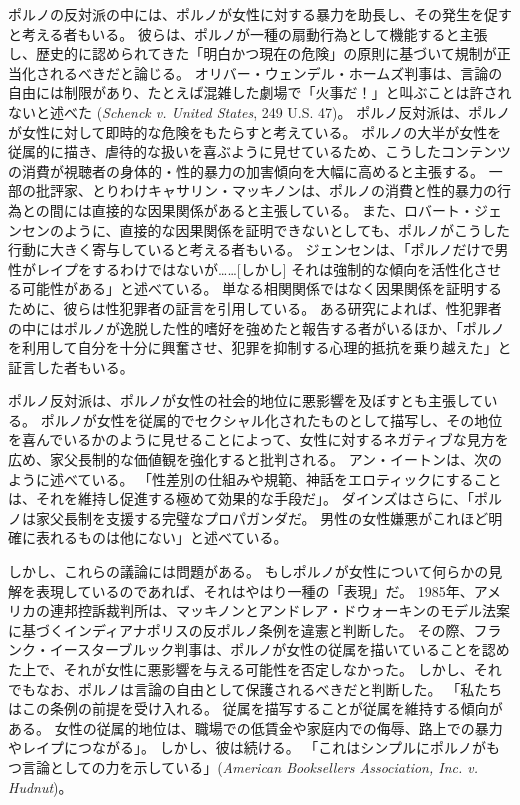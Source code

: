 \documentclass[paper=a4,book,openany]{jlreq} \usepackage{mystyle}
\begin{document}
ポルノの反対派の中には、ポルノが女性に対する暴力を助長し、その発生を促すと考える者もいる。
彼らは、ポルノが一種の扇動行為として機能すると主張し、歴史的に認められてきた「明白かつ現在の危険」の原則に基づいて規制が正当化されるべきだと論じる。
オリバー・ウェンデル・ホームズ判事は、言論の自由には制限があり、たとえば混雑した劇場で「火事だ！」と叫ぶことは許されないと述べた
(\emph{Schenck v. United States}, 249 U.S. 47)。
ポルノ反対派は、ポルノが女性に対して即時的な危険をもたらすと考えている。
ポルノの大半が女性を従属的に描き、虐待的な扱いを喜ぶように見せているため、こうしたコンテンツの消費が視聴者の身体的・性的暴力の加害傾向を大幅に高めると主張する。
一部の批評家、とりわけキャサリン・マッキノンは、ポルノの消費と性的暴力の行為との間には直接的な因果関係があると主張している\citep{mackinnon94:_pornog}。
また、ロバート・ジェンセンのように、直接的な因果関係を証明できないとしても、ポルノがこうした行動に大きく寄与していると考える者もいる。
ジェンセンは、「ポルノだけで男性がレイプをするわけではないが……[しかし] それは強制的な傾向を活性化させる可能性がある」と述べている\citep[p.103]{jensen07:gettingoff}。
単なる相関関係ではなく因果関係を証明するために、彼らは性犯罪者の証言を引用している。
ある研究によれば、性犯罪者の中にはポルノが逸脱した性的嗜好を強めたと報告する者がいるほか、「ポルノを利用して自分を十分に興奮させ、犯罪を抑制する心理的抵抗を乗り越えた」と証言した者もいる\citep[p.70]{marshall00:_revis_use_pornog_sexual_offen}。

ポルノ反対派は、ポルノが女性の社会的地位に悪影響を及ぼすとも主張している。
ポルノが女性を従属的でセクシャル化されたものとして描写し、その地位を喜んでいるかのように見せることによって、女性に対するネガティブな見方を広め、家父長制的な価値観を強化すると批判される\citep{hald13:_pornog_sexis_attit_among_heter}。
アン・イートンは、次のように述べている。
「性差別の仕組みや規範、神話をエロティックにすることは、それを維持し促進する極めて効果的な手段だ」\citep{eaton07:sensibleantiporn}。
ダインズはさらに、「ポルノは家父長制を支援する完璧なプロパガンダだ。
男性の女性嫌悪がこれほど明確に表れるものは他にない」と述べている\citep{bindel10:_truth_porn_indus}。

しかし、これらの議論には問題がある。
もしポルノが女性について何らかの見解を表現しているのであれば、それはやはり一種の「表現」だ。
1985年、アメリカの連邦控訴裁判所は、マッキノンとアンドレア・ドウォーキンのモデル法案に基づくインディアナポリスの反ポルノ条例を違憲と判断した。
その際、フランク・イースターブルック判事は、ポルノが女性の従属を描いていることを認めた上で、それが女性に悪影響を与える可能性を否定しなかった。
しかし、それでもなお、ポルノは言論の自由として保護されるべきだと判断した。
「私たちはこの条例の前提を受け入れる。
従属を描写することが従属を維持する傾向がある。
女性の従属的地位は、職場での低賃金や家庭内での侮辱、路上での暴力やレイプにつながる」。
しかし、彼は続ける。
「これはシンプルにポルノがもつ言論としての力を示している」(\emph{American Booksellers Association, Inc. v. Hudnut})。
\end{document}
